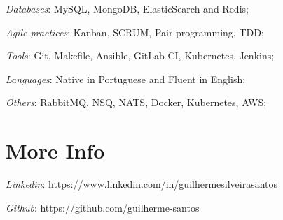 \documentclass[margin]{res}
\begin{document}
\begin{resume}
	\textit{Databases}: MySQL, MongoDB, ElasticSearch and Redis;

	\textit{Agile practices}: Kanban, SCRUM, Pair programming, TDD;

	\textit{Tools}: Git, Makefile, Ansible, GitLab CI, Kubernetes, Jenkins;

	\textit{Languages}: Native in Portuguese and Fluent in English;

	\textit{Others}: RabbitMQ, NSQ, NATS, Docker, Kubernetes, AWS;

\section{More Info}
	\textit{Linkedin}: https://www.linkedin.com/in/guilhermesilveirasantos

	\textit{Github}: https://github.com/guilherme-santos

\end{resume}
\end{document}
